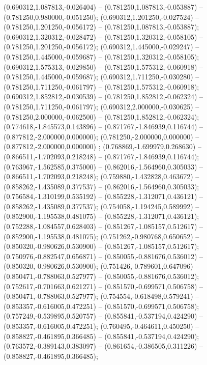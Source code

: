  (0.690312,1.087813,-0.026404) -- (0.781250,1.087813,-0.053887) -- (0.781250,0.980000,-0.051250);
 (0.690312,1.201250,-0.027524) -- (0.781250,1.201250,-0.056172) -- (0.781250,1.087813,-0.053887);
 (0.690312,1.320312,-0.028472) -- (0.781250,1.320312,-0.058105) -- (0.781250,1.201250,-0.056172);
 (0.690312,1.445000,-0.029247) -- (0.781250,1.445000,-0.059687) -- (0.781250,1.320312,-0.058105);
 (0.690312,1.575313,-0.029850) -- (0.781250,1.575312,-0.060918) -- (0.781250,1.445000,-0.059687);
 (0.690312,1.711250,-0.030280) -- (0.781250,1.711250,-0.061797) -- (0.781250,1.575312,-0.060918);
 (0.690312,1.852812,-0.030539) -- (0.781250,1.852812,-0.062324) -- (0.781250,1.711250,-0.061797);
 (0.690312,2.000000,-0.030625) -- (0.781250,2.000000,-0.062500) -- (0.781250,1.852812,-0.062324);
 (0.774618,-1.845573,0.143896) -- (0.871767,-1.846939,0.116744) -- (0.877812,-2.000000,0.000000);
 (0.781250,-2.000000,0.000000) -- (0.877812,-2.000000,0.000000) ;
 (0.768869,-1.699979,0.268630) -- (0.866511,-1.702093,0.218248) -- (0.871767,-1.846939,0.116744);
 (0.763967,-1.562585,0.375000) -- (0.862016,-1.564960,0.305033) -- (0.866511,-1.702093,0.218248);
 (0.759880,-1.432828,0.463672) -- (0.858262,-1.435089,0.377537) -- (0.862016,-1.564960,0.305033);
 (0.756584,-1.310199,0.535192) -- (0.855228,-1.312071,0.436121) -- (0.858262,-1.435089,0.377537);
 (0.754058,-1.194245,0.589992) -- (0.852900,-1.195538,0.481075) -- (0.855228,-1.312071,0.436121);
 (0.752288,-1.084557,0.628403) -- (0.851267,-1.085157,0.512617) -- (0.852900,-1.195538,0.481075);
 (0.751262,-0.980768,0.650652) -- (0.850320,-0.980626,0.530900) -- (0.851267,-1.085157,0.512617);
 (0.750976,-0.882547,0.656871) -- (0.850055,-0.881676,0.536012) -- (0.850320,-0.980626,0.530900);
 (0.751426,-0.789601,0.647096) -- (0.850471,-0.788063,0.527977) -- (0.850055,-0.881676,0.536012);
 (0.752617,-0.701663,0.621271) -- (0.851570,-0.699571,0.506758) -- (0.850471,-0.788063,0.527977);
 (0.754554,-0.618498,0.579241) -- (0.853357,-0.616005,0.472251) -- (0.851570,-0.699571,0.506758);
 (0.757249,-0.539895,0.520757) -- (0.855841,-0.537194,0.424290) -- (0.853357,-0.616005,0.472251);
 (0.760495,-0.464611,0.450250) -- (0.858827,-0.461895,0.366485) -- (0.855841,-0.537194,0.424290);
 (0.763572,-0.389143,0.383097) -- (0.861654,-0.386505,0.311226) -- (0.858827,-0.461895,0.366485);
